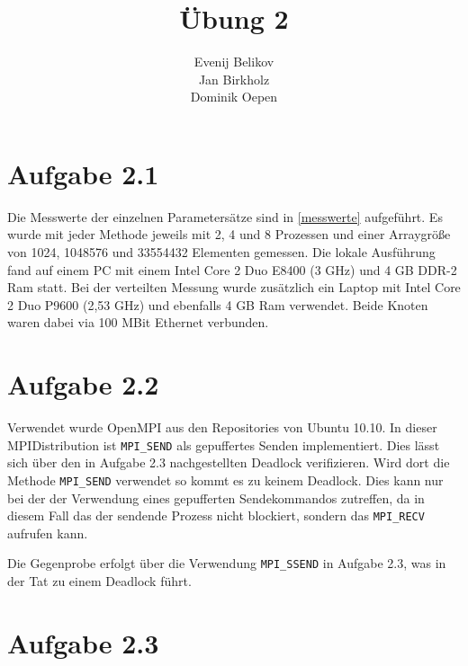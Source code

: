 \documentclass{scrartcl}
\begin{document}
\title{Übung 2}
\author{Evenij Belikov\\Jan Birkholz\\Dominik Oepen}
\maketitle

\section*{Aufgabe 2.1}



Die Messwerte der einzelnen Parametersätze sind in \autoref{messwerte} aufgeführt. Es wurde mit jeder Methode jeweils mit 2, 4 und 8 Prozessen und einer Arraygröße von 1024, 1048576 und 33554432 Elementen gemessen. Die lokale Ausführung fand auf einem PC mit einem Intel Core 2 Duo E8400 (3 GHz) und 4 GB DDR-2 Ram statt. Bei der verteilten Messung wurde zusätzlich ein Laptop mit Intel Core 2 Duo P9600 (2,53 GHz) und ebenfalls 4 GB Ram verwendet. Beide Knoten waren dabei via 100 MBit Ethernet verbunden.


\section*{Aufgabe 2.2}

Verwendet wurde OpenMPI aus den Repositories von Ubuntu 10.10. In
dieser MPI\-Distribution ist \texttt{MPI\_SEND} als gepuffertes Senden
implementiert. Dies lässt sich über den in Aufgabe 2.3 nachgestellten
Deadlock verifizieren. Wird dort die Methode \texttt{MPI\_SEND} verwendet so
kommt es zu keinem Deadlock. Dies kann nur bei der der Verwendung
eines gepufferten Sendekommandos zutreffen, da in diesem Fall das
der sendende Prozess nicht blockiert, sondern das \texttt{MPI\_RECV} aufrufen
kann.

Die Gegenprobe erfolgt über die Verwendung \texttt{MPI\_SSEND} in Aufgabe
2.3, was in der Tat zu einem Deadlock führt.

\section*{Aufgabe 2.3}

%
%
%
\end{document}
